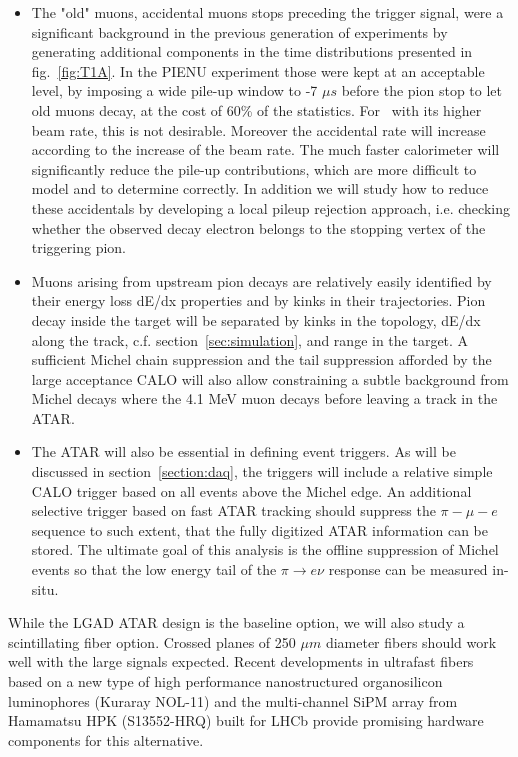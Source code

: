 \begin{itemize}
\item 
The "old" muons, accidental muons stops preceding the trigger signal, were a significant background in the previous generation of experiments by generating additional components in the time distributions
presented in fig.~\ref{fig:T1A}. In the PIENU experiment those were kept at an acceptable level, by imposing a wide pile-up window to -7 $\mu s$ before
the pion stop to let old muons decay, at the cost of 60\% of the statistics. For \nexp\, with its 
higher beam rate, this is not 
desirable.
Moreover the accidental rate will increase according to the increase of the beam rate. The much faster calorimeter will significantly reduce the pile-up contributions, which are more difficult to model and to determine correctly. In addition we will study how to reduce these accidentals by developing a local pileup rejection approach,
i.e. checking whether the observed decay electron belongs to the stopping vertex of the triggering pion.

\item
Muons arising from upstream pion decays are  relatively easily identified 
by their energy loss dE/dx properties and by  
kinks in their trajectories.
Pion decay
inside the target will be separated by kinks in the topology, dE/dx along the track, c.f. section~\ref{sec:simulation}, and range in the target. A sufficient Michel chain suppression and the tail suppression afforded by the 
large acceptance
CALO will also allow  constraining a subtle background from Michel decays where the 4.1 MeV
 muon decays before leaving a track in the ATAR. 

\item
The ATAR will also be essential in defining event triggers. As will be discussed in section~\ref{section:daq}, the triggers will include
a relative simple CALO trigger based on all events above the Michel edge. An additional selective trigger based on fast ATAR tracking should suppress the $\pi-\mu-e$ sequence
to such extent, that the fully digitized ATAR information can be stored. The ultimate goal of this analysis is the offline suppression of Michel events so that the
low energy tail of the $\pi \rightarrow e \nu$ response can be measured in-situ. 

\end{itemize}




While the LGAD ATAR design is the baseline option, we will also study a scintillating fiber option. Crossed planes of 250 $\mu m$ diameter
fibers should work well with the large signals expected. Recent developments in ultrafast fibers based on a new type of high performance nanostructured organosilicon luminophores (Kuraray NOL-11) and the  multi-channel  SiPM  array from  Hamamatsu  HPK  (S13552-HRQ) built for LHCb provide promising hardware components for this alternative.